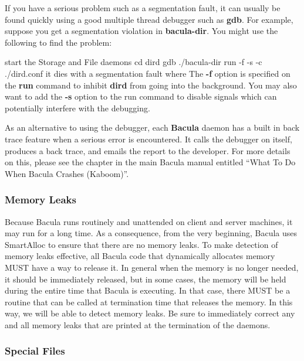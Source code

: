 If you have a serious problem such as a segmentation fault, it can usually be
found quickly using a good multiple thread debugger such as {\bf gdb}. For
example, suppose you get a segmentation violation in {\bf bacula-dir}. You
might use the following to find the problem: 

\lt{}start the Storage and File daemons\gt{}
cd dird
gdb ./bacula-dir
run -f -s -c ./dird.conf
\lt{}it dies with a segmentation fault\gt{}
where
The {\bf -f} option is specified on the {\bf run} command to inhibit {\bf
dird} from going into the background. You may also want to add the {\bf -s}
option to the run command to disable signals which can potentially interfere
with the debugging. 

As an alternative to using the debugger, each {\bf Bacula} daemon has a built
in back trace feature when a serious error is encountered. It calls the
debugger on itself, produces a back trace, and emails the report to the
developer. For more details on this, please see the chapter in the main Bacula
manual entitled ``What To Do When Bacula Crashes (Kaboom)''. 

\subsubsection*{Memory Leaks}

Because Bacula runs routinely and unattended on client and server machines, it
may run for a long time. As a consequence, from the very beginning, Bacula
uses SmartAlloc to ensure that there are no memory leaks. To make detection of
memory leaks effective, all Bacula code that dynamically allocates memory MUST
have a way to release it. In general when the memory is no longer needed, it
should be immediately released, but in some cases, the memory will be held
during the entire time that Bacula is executing. In that case, there MUST be a
routine that can be called at termination time that releases the memory. In
this way, we will be able to detect memory leaks. Be sure to immediately
correct any and all memory leaks that are printed at the termination of the
daemons. 

\subsubsection*{Special Files}

